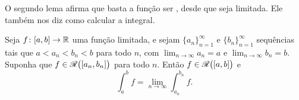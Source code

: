 O segundo lema afirma que basta a função ser , desde que seja limitada. Ele também nos diz como
calcular a integral.

\begin{lemma} \label{lemma:boundedimpriemann}
Seja $f \colon [a,b] \to {\mathbb{R}}$ uma função limitada, e sejam
$\{ a_n \}_{n=1}^\infty$ e $\{b_n \}_{n=1}^\infty$ sequências tais que
$a < a_n < b_n < b$ para todo $n$, com
$\lim_{n\to\infty} a_n = a$ e $\lim_{n\to\infty} b_n = b$.
Suponha que $f \in {\mathscr{R}}\bigl([a_n,b_n]\bigr)$ para todo $n$.
Então $f \in {\mathscr{R}}\bigl([a,b]\bigr)$ e
\begin{equation*}
\int_a^b f = 
\lim_{n \to \infty} \int_{a_n}^{b_n} f .
\end{equation*}
\end{lemma}

